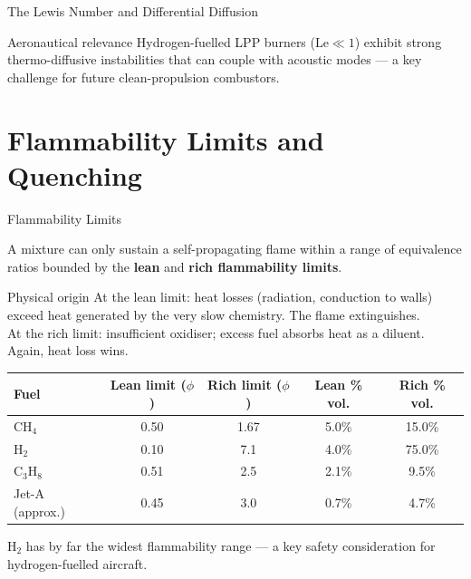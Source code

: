 \documentclass[12pt,aspectratio=169]{beamer}
\newcommand{\Le}{\mathrm{Le}}
\begin{document}
\begin{frame}{The Lewis Number and Differential Diffusion}
  \begin{exampleblock}{Aeronautical relevance}
    Hydrogen-fuelled LPP burners ($\Le \ll 1$) exhibit
    strong thermo-diffusive instabilities that can couple
    with acoustic modes --- a key challenge for future
    clean-propulsion combustors.
  \end{exampleblock}
\end{frame}

\section{Flammability Limits and Quenching}

\begin{frame}{Flammability Limits}

  A mixture can only sustain a self-propagating flame within a range
  of equivalence ratios bounded by the
  \textbf{lean} and \textbf{rich flammability limits}.

  \begin{block}{Physical origin}
    At the lean limit: heat losses (radiation, conduction to walls)
    exceed heat generated by the very slow chemistry.
    The flame extinguishes.\\
    At the rich limit: insufficient oxidiser; excess fuel absorbs heat
    as a diluent.  Again, heat loss wins.
  \end{block}

  \medskip
  \begin{center}
  \renewcommand{\arraystretch}{1.3}
  \begin{tabular}{lcccc}
    \toprule
    Fuel & Lean limit ($\phi$) & Rich limit ($\phi$) &
          Lean \% vol. & Rich \% vol. \\
    \midrule
    CH$_4$ & 0.50 & 1.67 & 5.0\% & 15.0\% \\
    H$_2$  & 0.10 & 7.1  & 4.0\% & 75.0\% \\
    C$_3$H$_8$ & 0.51 & 2.5 & 2.1\% & 9.5\% \\
    Jet-A (approx.) & 0.45 & 3.0 & 0.7\% & 4.7\% \\
    \bottomrule
  \end{tabular}
  \end{center}

  \medskip
  \small H$_2$ has by far the widest flammability range ---
  a key safety consideration for hydrogen-fuelled aircraft.
\end{frame}
\end{document}

